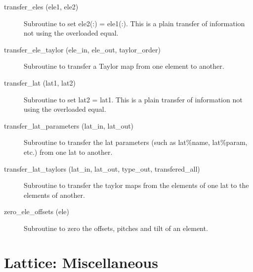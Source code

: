 \begin{description}
\item[transfer_eles (ele1, ele2)] \Newline 
     Subroutine to set ele2(:) = ele1(:). 
     This is a plain transfer of information not using the overloaded equal.

\item[transfer_ele_taylor (ele_in, ele_out, taylor_order)] \Newline 
     Subroutine to transfer a Taylor map from one element to another.

\item[transfer_lat (lat1, lat2)] \Newline 
     Subroutine to set lat2 = lat1. 
     This is a plain transfer of information not using the overloaded equal.

\item[transfer_lat_parameters (lat_in, lat_out)] \Newline
Subroutine to transfer the lat parameters (such as lat\%name, 
lat\%param, etc.) from one lat to another. 

\item[transfer_lat_taylors (lat_in, lat_out, 
                        type_out, transfered_all) ] \Newline 
Subroutine to transfer the taylor maps from the elements of one lat to
the elements of another. 

\item[zero_ele_offsets (ele)] \Newline 
Subroutine to zero the offsets, pitches and tilt of an element.

\end{description}

\section{Lattice: Miscellaneous}
\label{r:misc.help}

